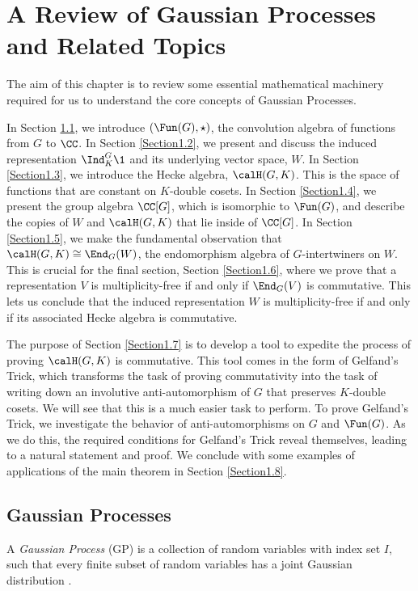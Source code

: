 \section{A Review of Gaussian Processes and Related Topics}\label{Chapter1}
The aim of this chapter is to review some essential mathematical machinery required for us to understand the core concepts of Gaussian Processes.

In Section \ref{Section1.1}, we introduce $(\Fun(G),\star)$, the convolution algebra of functions from $G$ to $\CC$.
In Section \ref{Section1.2}, we present and discuss the induced representation $\Ind_K^G\1$ and its underlying vector space, $W$.
In Section \ref{Section1.3}, we introduce the Hecke algebra, $\calH(G,K)$.
This is the space of functions that are constant on $K$-double cosets.
In Section \ref{Section1.4}, we present the group algebra $\CC[G]$, which is isomorphic to $\Fun(G)$, and describe the copies of $W$ and $\calH(G,K)$ that lie inside of $\CC[G]$.
In Section \ref{Section1.5}, we make the fundamental observation that $\calH(G,K)\cong\End_G(W)$, the endomorphism algebra of $G$-intertwiners on $W$.
This is crucial for the final section, Section \ref{Section1.6}, where we prove that a representation $V$ is multiplicity-free if and only if $\End_G(V)$ is commutative.
This lets us conclude that the induced representation $W$ is multiplicity-free if and only if its associated Hecke algebra is commutative.

The purpose of Section \ref{Section1.7} is to develop a tool to expedite the process of proving $\calH(G,K)$ is commutative.
This tool comes in the form of Gelfand's Trick, which transforms the task of proving commutativity into the task of writing down an involutive anti-automorphism of $G$ that preserves $K$-double cosets.
We will see that this is a much easier task to perform.
To prove Gelfand's Trick, we investigate the behavior of anti-automorphisms on $G$ and $\Fun(G)$.
As we do this, the required conditions for Gelfand's Trick reveal themselves, leading to a natural statement and proof.
We conclude with some examples of applications of the main theorem in Section \ref{Section1.8}.


\subsection{Gaussian Processes}\label{Section1.1}
A {\it Gaussian Process} (GP) is a collection of random variables with index set $I$, such that every finite subset of random variables has a joint Gaussian distribution \cite{RasmussenCarlEdward2006Gpfm,MurphyKevinP2012Ml}.

